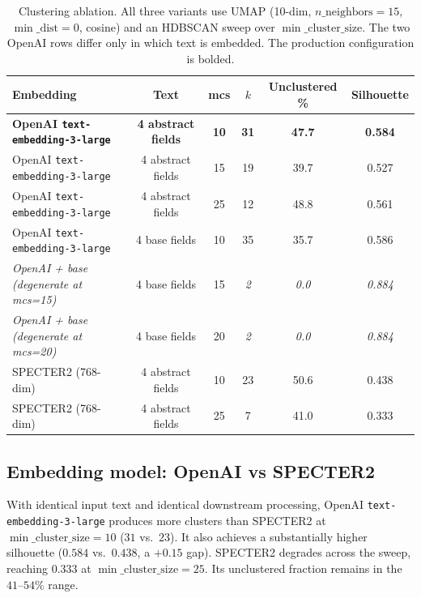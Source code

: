 \documentclass[10pt,a4paper]{article}
\begin{document}
\begin{table}[!htbp]
\centering
\caption{Clustering ablation. All three variants use UMAP (10-dim, $n\_\text{neighbors}{=}15$, $\min\_\text{dist}{=}0$, cosine) and an HDBSCAN sweep over $\min\_\text{cluster\_size}$. The two OpenAI rows differ only in which text is embedded. The production configuration is bolded.}
\label{tab:ablation}
\small
\begin{tabular}{l c c c c c}
\toprule
\textbf{Embedding} & \textbf{Text} & \textbf{mcs} & $k$ & \textbf{Unclustered \%} & \textbf{Silhouette} \\
\midrule
\textbf{OpenAI \texttt{text-embedding-3-large}} & \textbf{4 abstract fields} & \textbf{10} & \textbf{31} & \textbf{47.7} & \textbf{0.584} \\
OpenAI \texttt{text-embedding-3-large}          & 4 abstract fields          & 15 & 19 & 39.7 & 0.527 \\
OpenAI \texttt{text-embedding-3-large}          & 4 abstract fields          & 25 & 12 & 48.8 & 0.561 \\
\midrule
OpenAI \texttt{text-embedding-3-large}          & 4 base fields              & 10 & 35 & 35.7 & 0.586 \\
\textit{OpenAI + base (degenerate at mcs=15)}   & 4 base fields              & 15 & \textit{2} & \textit{0.0} & \textit{0.884} \\
\textit{OpenAI + base (degenerate at mcs=20)}   & 4 base fields              & 20 & \textit{2} & \textit{0.0} & \textit{0.884} \\
\midrule
SPECTER2 (768-dim)                              & 4 abstract fields          & 10 & 23 & 50.6 & 0.438 \\
SPECTER2 (768-dim)                              & 4 abstract fields          & 25 &  7 & 41.0 & 0.333 \\
\bottomrule
\end{tabular}
\end{table}

\subsection{Embedding model: OpenAI vs SPECTER2}

With identical input text and identical downstream processing, OpenAI \texttt{text-embedding-3-large} produces more clusters than SPECTER2 at $\min\_\text{cluster\_size}=10$ ($31$ vs.\ $23$). It also achieves a substantially higher silhouette ($0.584$ vs.\ $0.438$, a $+0.15$ gap). SPECTER2 degrades across the sweep, reaching $0.333$ at $\min\_\text{cluster\_size}=25$. Its unclustered fraction remains in the $41$--$54\%$ range.
\end{document}
